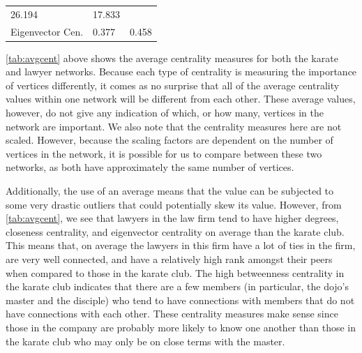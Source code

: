 \documentclass[12pt,twoside]{amherstthesis}
\begin{document}
\begin{longtable}[]{@{}lll@{}}
\begin{minipage}[t]{0.29\columnwidth}
  26.194\strut
  \end{minipage} & \begin{minipage}[t]{0.23\columnwidth}\raggedright\strut
  17.833\strut
  \end{minipage}\tabularnewline
  \begin{minipage}[t]{0.27\columnwidth}\raggedright\strut
  Eigenvector Cen.\strut
  \end{minipage} & \begin{minipage}[t]{0.29\columnwidth}\raggedright\strut
  0.377\strut
  \end{minipage} & \begin{minipage}[t]{0.23\columnwidth}\raggedright\strut
  0.458\strut
  \end{minipage}\tabularnewline
  \bottomrule
  \end{longtable}
  
  \autoref{tab:avgcent} above shows the average centrality measures for
  both the karate and lawyer networks. Because each type of centrality is
  measuring the importance of vertices differently, it comes as no
  surprise that all of the average centrality values within one network
  will be different from each other. These average values, however, do not
  give any indication of which, or how many, vertices in the network are
  important. We also note that the centrality measures here are not
  scaled. However, because the scaling factors are dependent on the number
  of vertices in the network, it is possible for us to compare between
  these two networks, as both have approximately the same number of
  vertices.
  
  Additionally, the use of an average means that the value can be
  subjected to some very drastic outliers that could potentially skew its
  value. However, from \autoref{tab:avgcent}, we see that lawyers in the
  law firm tend to have higher degrees, closeness centrality, and
  eigenvector centrality on average than the karate club. This means that,
  on average the lawyers in this firm have a lot of ties in the firm, are
  very well connected, and have a relatively high rank amongst their peers
  when compared to those in the karate club. The high betweenness
  centrality in the karate club indicates that there are a few members (in
  particular, the dojo's master and the disciple) who tend to have
  connections with members that do not have connections with each other.
  These centrality measures make sense since those in the company are
  probably more likely to know one another than those in the karate club
  who may only be on close terms with the master.
  
\end{document}
